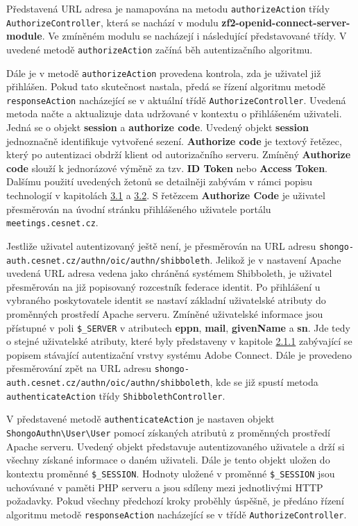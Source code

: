 \documentclass[
  printed, %
  twoside, %
  table,   %
  nolof,     %
  nolot,     %
]{fithesis3}
\begin{document}
Představená URL adresa je namapována na metodu \texttt{authorizeAction} třídy \texttt{AuthorizeController}, která se nachází v modulu \textbf{zf2-openid-connect-server-module}. Ve zmíněném modulu  se nacházejí i následující představované třídy. V uvedené metodě \texttt{authorizeAction} začíná běh autentizačního algoritmu. \par 

Dále je v metodě \texttt{authorizeAction} provedena kontrola, zda je uživatel již přihlášen. Pokud tato skutečnost nastala, předá se řízení algoritmu metodě \texttt{responseAction} nacházející se v aktuální třídě \texttt{AuthorizeController}. Uvedená metoda načte a  aktualizuje data udržované v kontextu o přihlášeném uživateli. Jedná se o objekt \textbf{session} a \textbf{authorize code}. Uvedený objekt \textbf{session} jednoznačně identifikuje vytvořené sezení. \textbf{Authorize code} je textový řetězec, který po autentizaci obdrží klient od autorizačního serveru. Zmíněný \textbf{Authorize code} slouží k jednorázové výměně za tzv. \textbf{ID Token} nebo \textbf{Access Token}. Dalšímu použití uvedených žetonů se detailněji zabývám v rámci popisu technologií v kapitolách \hyperref[sec:oauth]{3.1} a \hyperref[sec:oidc]{3.2}. S řetězcem \textbf{Authorize Code} je uživatel přesměrován na úvodní stránku přihlášeného uživatele portálu \texttt{meetings.cesnet.cz}. \par 

Jestliže uživatel autentizovaný ještě není, je přesměrován na URL adresu \texttt{shongo-auth.cesnet.cz/authn/oic/authn/shibboleth}. Jelikož je v nastavení Apache uvedená URL adresa vedena jako chráněná systémem Shibboleth, je uživatel přesměrován na již popisovaný rozcestník federace identit. Po přihlášení u vybraného poskytovatele identit se nastaví základní uživatelské atributy do proměnných prostředí Apache serveru. Zmíněné uživatelské informace jsou přístupné v poli \texttt{\$\_SERVER} v atributech \textbf{eppn}, \textbf{mail}, \textbf{givenName} a \textbf{sn}. Jde tedy o stejné uživatelské atributy, které byly představeny v kapitole \hyperref[item:adobe-connect]{2.1.1} zabývající se popisem stávající autentizační vrstvy systému Adobe Connect. Dále je provedeno přesměrování zpět na URL adresu \texttt{shongo-auth.cesnet.cz/authn/oic/authn/shibboleth}, kde se již spustí metoda \texttt{authenticateAction} třídy \texttt{ShibbolethController}. \par

V představené metodě \texttt{authenticateAction} je nastaven objekt \texttt{ShongoAuthn\textbackslash User\textbackslash User} pomocí získaných atributů z proměnných prostředí Apache serveru. Uvedený objekt představuje autentizovaného uživatele a drží si všechny získané informace o daném uživateli. Dále je tento objekt uložen do kontextu proměnné \texttt{\$\_SESSION}. Hodnoty uložené v proměnné \texttt{\$\_SESSION} jsou uchovávané v paměti PHP serveru a jsou sdíleny mezi jednotlivými HTTP požadavky. Pokud všechny předchozí kroky proběhly úspěšně, je předáno řízení algoritmu metodě \texttt{responseAction} nacházející se v třídě \texttt{AuthorizeController}. \par
\end{document}
